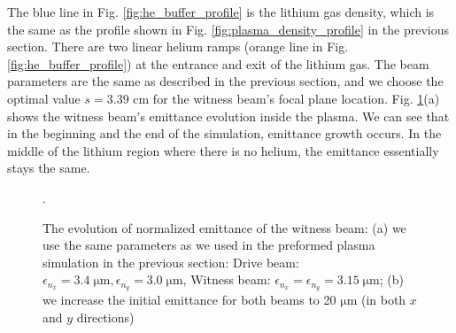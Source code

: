 \documentclass[%
reprint, superscriptaddress,
 amsmath,amssymb, aps,
prstab,
]{revtex4-2}
\begin{document}
The blue line in Fig. \ref{fig:he_buffer_profile} is the lithium gas
density, which is the same as the profile shown in
Fig. \ref{fig:plasma_density_profile} in the previous section. There are two
linear helium ramps (orange line in Fig. \ref{fig:he_buffer_profile}) at
the entrance and exit of the lithium gas. The beam parameters are the
same as described in the previous section, and we choose the optimal value
$s=3.39$ cm for the witness beam's focal plane location.
Fig. \ref{fig:he_buffer_emittance_growth}(a) shows the witness beam's
emittance evolution inside the plasma. We can see that in the beginning
and the end of the simulation, emittance growth occurs. In the
middle of the lithium region where there is no helium, the emittance essentially stays the same.
\begin{figure}[htbp] 
        \caption{The evolution of normalized emittance of the witness beam: (a) we use the same
        parameters as we used in the preformed plasma simulation in the
        previous section: Drive beam: $\epsilon_{n_x} = 3.4\; \mathrm{\mu m},
        \epsilon_{n_y} = 3.0\; \mathrm{\mu m}$, Witness beam: $\epsilon_{n_x} =
        \epsilon_{n_y} = 3.15\; \mathrm{\mu m}$; (b) we increase the initial
        emittance for both beams to 20 $\mathrm{\mu m}$ (in both $x$ and
        $y$ directions)}. \label{fig:he_buffer_emittance_growth}
        \end{figure} 
        
\end{document}
